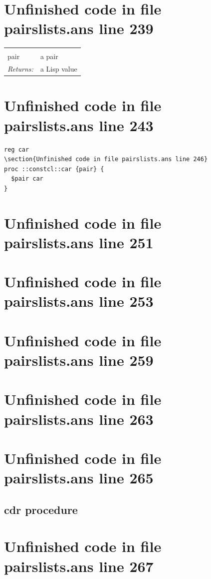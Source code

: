 \documentclass[twoside,9pt]{report}
\begin{document}
\section{Unfinished code in file pairslists.ans line 239}
\noindent\begin{tabular}{ |p{1.9cm} p{8cm}| }
\hline
\rowcolor[HTML]{CCCCCC} \multicolumn{2}{|l|}{\bf car (public)} \\
pair & a pair \\
\textit{Returns:} & a Lisp value \\
\hline
\end{tabular}
\section{Unfinished code in file pairslists.ans line 243}
\begin{lstlisting}
reg car
\section{Unfinished code in file pairslists.ans line 246}
proc ::constcl::car {pair} {
  $pair car
}
\end{lstlisting}
\section{Unfinished code in file pairslists.ans line 251}
\section{Unfinished code in file pairslists.ans line 253}
\section{Unfinished code in file pairslists.ans line 259}
\section{Unfinished code in file pairslists.ans line 263}
\section{Unfinished code in file pairslists.ans line 265}
\subsection{cdr procedure}
\label{cdr-procedure}
\section{Unfinished code in file pairslists.ans line 267}
\end{document}
